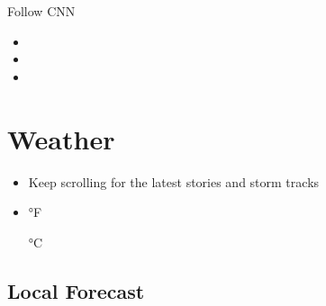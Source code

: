 Follow CNN

\begin{itemize}
\item
\item
\item
\end{itemize}

\hypertarget{weather}{%
\section{Weather}\label{weather}}

\begin{itemize}
\item
  Keep scrolling for the latest stories and storm tracks
\end{itemize}

\begin{itemize}
\item
  °F

  °C
\end{itemize}

\hypertarget{local-forecast--}{%
\subsection{Local Forecast ~}\label{local-forecast--}}


